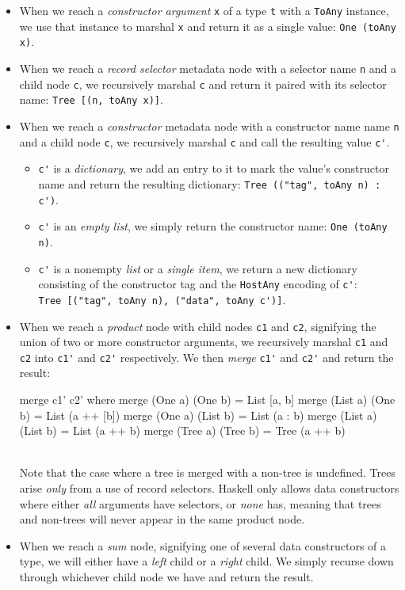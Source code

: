\documentclass[preprint]{sigplanconf}
\begin{document}
\begin{itemize}
\item
  When we reach a \emph{constructor argument} \lstinline!x! of a type
  \lstinline!t! with a \lstinline!ToAny! instance, we use that instance to
  marshal \lstinline!x! and return it as a single value:
  \lstinline!One (toAny x)!.
\item
  When we reach a \emph{record selector} metadata node with a selector
  name \lstinline!n! and a child node \lstinline!c!, we recursively marshal
  \lstinline!c! and return it paired with its selector name:
  \lstinline!Tree [(n, toAny x)]!.
\item
  When we reach a \emph{constructor} metadata node with a constructor name
  name \lstinline!n! and a child node \lstinline!c!, we recursively marshal
  \lstinline!c! and call the resulting value \lstinline!c'!.
  \begin{itemize}
  \item
    \lstinline!c'! is a \emph{dictionary}, we add an entry to it to mark the
    value's constructor name and return the resulting dictionary:
    \lstinline!Tree (("tag", toAny n) : c')!.
  \item
    \lstinline!c'! is an \emph{empty list}, we simply return the constructor
    name:
    \lstinline!One (toAny n)!.
  \item
    \lstinline!c'! is a nonempty \emph{list} or a \emph{single item},
    we return a new dictionary consisting of the constructor tag and the
    \lstinline!HostAny! encoding of \lstinline!c'!:\\
    \lstinline!Tree [("tag", toAny n), ("data", toAny c')]!.
  \end{itemize}
\item
  When we reach a \emph{product} node with child nodes \lstinline!c1! and
  \lstinline!c2!, signifying the union of two or more constructor arguments,
  we recursively marshal \lstinline!c1! and \lstinline!c2! into
  \lstinline!c1'! and \lstinline!c2'! respectively. We then \emph{merge}
  \lstinline!c1'! and \lstinline!c2'! and return the result:
  \begin{code}
    merge c1' c2'
      where
        merge (One a) (One b)   = List [a, b]
        merge (List a) (One b)  = List (a ++ [b])
        merge (One a) (List b)  = List (a : b)
        merge (List a) (List b) = List (a ++ b)
        merge (Tree a) (Tree b) = Tree (a ++ b)
  \end{code}\\
  Note that the case where a tree is merged with a non-tree is undefined.
  Trees arise \emph{only} from a use of record selectors. Haskell only
  allows data constructors where either \emph{all} arguments have selectors,
  or \emph{none} has, meaning that trees and non-trees will never appear in
  the same product node.
\item
  When we reach a \emph{sum} node, signifying one of several data constructors
  of a type, we will either have a \emph{left} child or a \emph{right} child.
  We simply recurse down through whichever child node we have and return the
  result.
\end{itemize}
\end{document}
